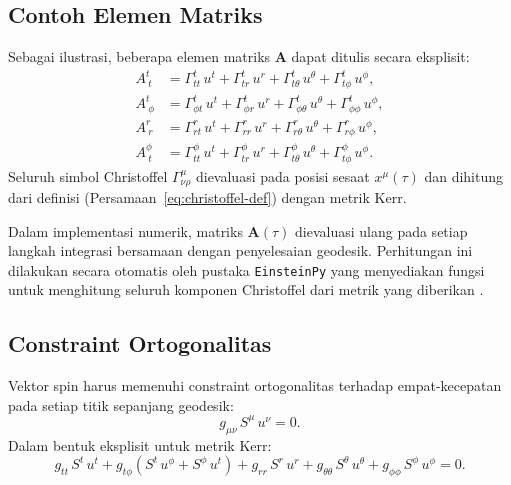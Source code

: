 \subsection{Contoh Elemen Matriks}
\label{subsec:contoh-elemen-A}

Sebagai ilustrasi, beberapa elemen matriks $\mathbf{A}$ dapat ditulis secara eksplisit:
\begin{align}
    A^t_{\ t} &= \Gamma^t_{tt}\,u^t + \Gamma^t_{tr}\,u^r
              + \Gamma^t_{t\theta}\,u^\theta + \Gamma^t_{t\phi}\,u^\phi,
    \label{eq:Att} \\[4pt]
    A^t_{\ \phi} &= \Gamma^t_{\phi t}\,u^t + \Gamma^t_{\phi r}\,u^r
                 + \Gamma^t_{\phi\theta}\,u^\theta + \Gamma^t_{\phi\phi}\,u^\phi,
    \label{eq:Atphi} \\[4pt]
    A^r_{\ r} &= \Gamma^r_{rt}\,u^t + \Gamma^r_{rr}\,u^r
              + \Gamma^r_{r\theta}\,u^\theta + \Gamma^r_{r\phi}\,u^\phi,
    \label{eq:Arr} \\[4pt]
    A^\phi_{\ t} &= \Gamma^\phi_{tt}\,u^t + \Gamma^\phi_{tr}\,u^r
                 + \Gamma^\phi_{t\theta}\,u^\theta + \Gamma^\phi_{t\phi}\,u^\phi.
    \label{eq:Aphit}
\end{align}
Seluruh simbol Christoffel $\Gamma^\mu_{\nu\rho}$ dievaluasi pada posisi sesaat $x^\mu(\tau)$
dan dihitung dari definisi (Persamaan~\ref{eq:christoffel-def})
dengan metrik Kerr.

Dalam implementasi numerik, matriks $\mathbf{A}(\tau)$ dievaluasi ulang
pada setiap langkah integrasi bersamaan dengan penyelesaian geodesik.
Perhitungan ini dilakukan secara otomatis oleh pustaka \texttt{EinsteinPy}
yang menyediakan fungsi untuk menghitung seluruh komponen Christoffel
dari metrik yang diberikan \parencite{Bapat2020EinsteinPy}.


\subsection{Constraint Ortogonalitas}
\label{subsec:constraint-ortogonalitas}

Vektor spin harus memenuhi constraint ortogonalitas terhadap empat-kecepatan
pada setiap titik sepanjang geodesik:
\begin{equation}
    g_{\mu\nu}\, S^\mu\, u^\nu = 0.
    \label{eq:ortogonalitas}
\end{equation}
Dalam bentuk eksplisit untuk metrik Kerr:
\begin{equation}
    g_{tt}\, S^t\, u^t + g_{t\phi}(S^t\, u^\phi + S^\phi\, u^t)
    + g_{rr}\, S^r\, u^r + g_{\theta\theta}\, S^\theta\, u^\theta
    + g_{\phi\phi}\, S^\phi\, u^\phi = 0.
    \label{eq:ortogonalitas-eksplisit}
\end{equation}

